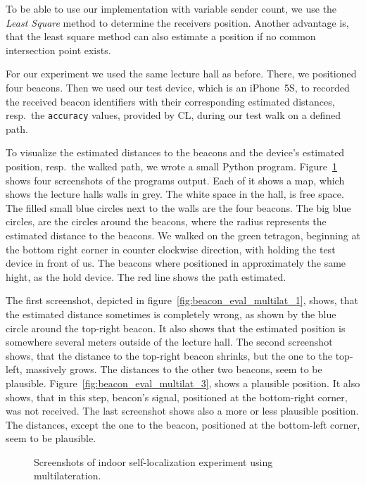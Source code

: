 To be able to use our implementation with variable sender count, we use the \emph{Least Square} method to determine the receivers position. Another advantage is, that the least square method can also estimate a position if no common intersection point exists.

For our experiment we used the same lecture hall as before. There, we positioned four beacons. Then we used our test device, which is an iPhone~5S, to recorded the received beacon identifiers with their corresponding estimated distances, resp.\ the \texttt{accuracy} values, provided by \acs{CL}, during our test walk on a defined path.

To visualize the estimated distances to the beacons and the device's estimated position, resp.\ the walked path, we wrote a small Python program. Figure~\ref{fig:beacon_eval_multilat} shows four screenshots of the programs output. Each of it shows a map, which shows the lecture halls walls in grey. The white space in the hall, is free space. The filled small blue circles next to the walls are the four beacons. The big blue circles, are the circles around the beacons, where the radius represents the estimated distance to the beacons. We walked on the green tetragon, beginning at the bottom right corner in counter clockwise direction, with holding the test device in front of us. The beacons where positioned in approximately the same hight, as the hold device. The red line shows the path estimated.

The first screenshot, depicted in figure~\ref{fig:beacon_eval_multilat_1}, shows, that the estimated distance sometimes is completely wrong, as shown by the blue circle around the top-right beacon. It also shows that the estimated position is somewhere several meters outside of the lecture hall. The second screenshot shows, that the distance to the top-right beacon shrinks, but the one to the top-left, massively grows. The distances to the other two beacons, seem to be plausible. Figure~\ref{fig:beacon_eval_multilat_3}, shows a plausible position. It also shows, that in this step, beacon's signal, positioned at the bottom-right corner, was not received. The last screenshot shows also a more or less plausible position. The distances, except the one to the beacon, positioned at the bottom-left corner, seem to be plausible.

\begin{figure}
  
  \caption{Screenshots of indoor self-localization experiment using multilateration.}
  \label{fig:beacon_eval_multilat}
\end{figure}

